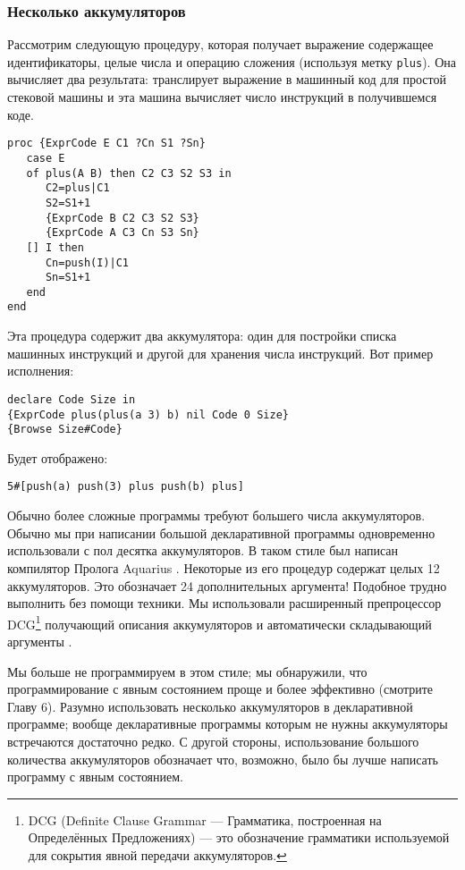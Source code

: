 \subsubsection{Несколько аккумуляторов}

Рассмотрим следующую процедуру, которая получает выражение содержащее идентификаторы, целые числа и операцию сложения (используя метку \lstinline!plus!). Она вычисляет два результата: транслирует выражение в машинный код для простой стековой машины и эта машина вычисляет число инструкций в получившемся коде.

\begin{lstlisting}
proc {ExprCode E C1 ?Cn S1 ?Sn}
   case E
   of plus(A B) then C2 C3 S2 S3 in
      C2=plus|C1
      S2=S1+1
      {ExprCode B C2 C3 S2 S3}
      {ExprCode A C3 Cn S3 Sn}
   [] I then
      Cn=push(I)|C1
      Sn=S1+1
   end
end
\end{lstlisting}

Эта процедура содержит два аккумулятора: один для постройки списка машинных инструкций и другой для хранения числа инструкций. Вот пример исполнения:

\begin{lstlisting}
declare Code Size in
{ExprCode plus(plus(a 3) b) nil Code 0 Size}
{Browse Size#Code}
\end{lstlisting}

Будет отображено:

\begin{lstlisting}
5#[push(a) push(3) plus push(b) plus]
\end{lstlisting}

Обычно более сложные программы требуют большего числа аккумуляторов. Обычно мы при написании большой декларативной программы одновременно использовали с пол десятка аккумуляторов. В таком стиле был написан компилятор Пролога Aquarius \cite{198, 194}. Некоторые из его процедур содержат целых 12 аккумуляторов. Это обозначает 24 дополнительных аргумента! Подобное трудно выполнить без помощи техники. Мы использовали расширенный препроцессор DCG\footnote{DCG (Definite Clause Grammar --- Грамматика, построенная на Определённых Предложениях) --- это обозначение грамматики используемой для сокрытия явной передачи аккумуляторов.} получающий описания аккумуляторов и автоматически складывающий аргументы \cite{96}.

Мы больше не программируем в этом стиле; мы обнаружили, что программирование с явным состоянием проще и более эффективно (смотрите Главу 6). Разумно использовать несколько аккумуляторов в декларативной программе; вообще декларативные программы которым не нужны аккумуляторы встречаются достаточно редко. С другой стороны, использование большого количества аккумуляторов обозначает что, возможно, было бы лучше написать программу с явным состоянием.

